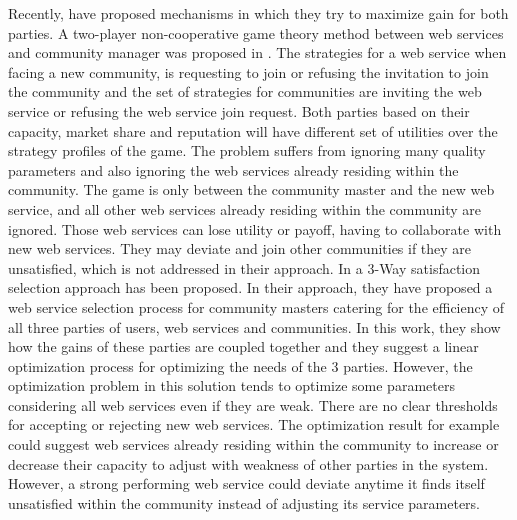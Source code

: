\documentclass[10pt, conference, compsocconf]{IEEEtran}
\theoremstyle{plain}
\theoremstyle{definition}
\begin{document}
Recently, \cite{DBLP:conf/IEEEscc/LimTMB12, DBLP:conf/IEEEscc/KhosravifarABT11} have proposed mechanisms in which they try to maximize gain for both parties. A two-player non-cooperative game theory method between web services and community manager was proposed in \cite{DBLP:conf/IEEEscc/KhosravifarABT11}. The strategies for a web service when facing a new community, is requesting to join or refusing the invitation to join the community and the set of strategies for communities are inviting the web service or refusing the web service join request. Both parties based on their capacity, market share and reputation will have different set of utilities over the strategy profiles of the game. The problem suffers from ignoring many quality parameters and also ignoring the web services already residing within the community. The game is only between the community master and the new web service, and all other web services already residing within the community are ignored. Those web services can lose utility or payoff, having to collaborate with new web services. They may deviate and join other communities if they are unsatisfied, which is not addressed in their approach. In \cite{DBLP:conf/IEEEscc/LimTMB12} a 3-Way satisfaction selection approach has been proposed. In their approach, they have proposed a web service selection process for community masters catering for the efficiency of all three parties of users, web services and communities. In this work, they show how the gains of these parties are coupled together and they suggest a linear optimization process for optimizing the needs of the 3 parties. However, the optimization problem in this solution tends to optimize some parameters considering all web services even if they are weak. There are no clear thresholds for accepting or rejecting new web services. The optimization result for example could suggest web services already residing within the community to increase or decrease their capacity to adjust with weakness of other parties in the system. However, a strong performing web service could deviate anytime it finds itself unsatisfied within the community instead of adjusting its service parameters.
\end{document}
